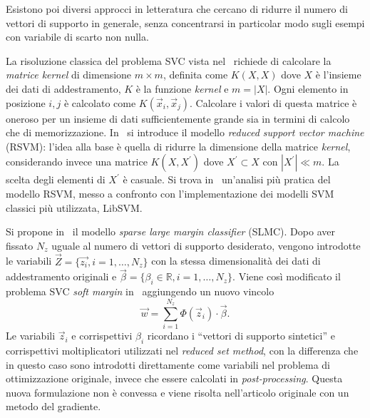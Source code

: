 Esistono poi diversi approcci in letteratura che cercano di ridurre il numero di vettori di supporto in generale, senza concentrarsi in particolar modo sugli esempi con variabile di scarto non nulla.


La risoluzione classica del problema SVC vista nel~ richiede di calcolare la \emph{matrice kernel} di dimensione $m\times m$, definita come $K(X,X)$ dove $X$ è l'insieme dei dati di addestramento, $K$ è la funzione \emph{kernel} e $m=|X|$. 
Ogni elemento in posizione $i,j$ è calcolato come $K(\Vec{x}_i, \Vec{x}_j)$. 
Calcolare i valori di questa matrice è oneroso per un insieme di dati sufficientemente grande sia in termini di calcolo che di memorizzazione. 
In~\cite{2001_rsvm} si introduce il modello \emph{reduced support vector machine} (RSVM): l'idea alla base è quella di ridurre la dimensione della matrice \emph{kernel}, considerando invece una matrice $K(X,X^{'})$ dove $X^{'} \subset X$ con $|X^{'}| \ll m$. 
La scelta degli elementi di $X^{'}$ è casuale. 
Si trova in~\cite{2003_rsvm_comparison} un'analisi più pratica del modello RSVM, messo a confronto con l'implementazione dei modelli SVM classici più utilizzata, LibSVM\cite{libsvm}.

Si propone in~\cite{2005_SLMC} il modello \emph{sparse large margin classifier} (SLMC). 
Dopo aver fissato $N_z$ uguale al numero di vettori di supporto desiderato, vengono introdotte le variabili $\Vec{Z} = \{\Vec{z_i}, i=1,\dots,N_z\}$ con la stessa dimensionalità dei dati di addestramento originali e $\Vec{\beta} = \{\beta_i \in \mathbb{R}, i=1,\dots,N_z\}$.
Viene così modificato il problema SVC \emph{soft margin} in~ aggiungendo un nuovo vincolo
\begin{equation*}
    \Vec{w} = \sum_{i=1}^{N_z} \Phi(\Vec{z}_i) \cdot \Vec{\beta}.
\end{equation*}
Le variabili $\Vec{z}_i$ e corrispettivi $\beta_i$ ricordano i ``vettori di supporto sintetici'' e corrispettivi moltiplicatori utilizzati nel \emph{reduced set method}, con la differenza che in questo caso sono introdotti direttamente come variabili nel problema di ottimizzazione originale, invece che essere calcolati in \emph{post-processing}.
Questa nuova formulazione non è convessa e viene risolta nell'articolo originale con un metodo del gradiente.

